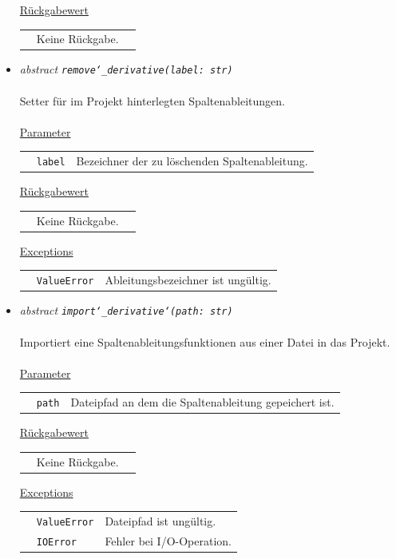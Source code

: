 \documentclass{article}
\begin{document}
\begin{itemize}
\underline{Rückgabewert}\\
\begin{tabular}{lll}
 & Keine Rückgabe.\\
\end{tabular}


\item \textit{\flqq{}abstract\frqq} \texttt{\textit{remove\char`_derivative(label: str)}}\\\\
Setter für im Projekt hinterlegten Spaltenableitungen.
\\\\
\underline{Parameter}\\
\begin{tabular}{lll}
 & \texttt{label} & Bezeichner der zu löschenden Spaltenableitung.\\
\end{tabular}

\underline{Rückgabewert}\\
\begin{tabular}{lll}
 & Keine Rückgabe.\\
\end{tabular}

\underline{Exceptions}\\
\begin{tabular}{lll}
 & \texttt{ValueError} & Ableitungsbezeichner ist ungültig.\\
\end{tabular}


\item \textit{\flqq{}abstract\frqq} \texttt{\textit{import\char`_derivative\char`(path: str)}}\\\\
Importiert eine Spaltenableitungsfunktionen aus einer Datei in das Projekt.
\\\\
\underline{Parameter}\\
\begin{tabular}{lll}
 & \texttt{path} & Dateipfad an dem die Spaltenableitung gepeichert ist.\\
\end{tabular}

\underline{Rückgabewert}\\
\begin{tabular}{lll}
 & Keine Rückgabe.\\
\end{tabular}

\underline{Exceptions}\\
\begin{tabular}{lll}
 & \texttt{ValueError} & Dateipfad ist ungültig.\\
 & \texttt{IOError} & Fehler bei I/O-Operation.\\
\end{tabular}



\end{itemize}
\end{document}
